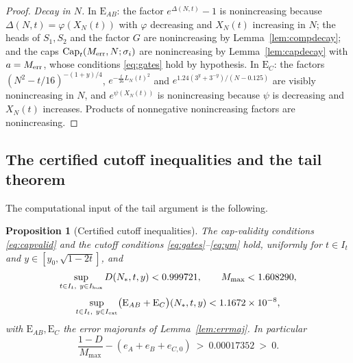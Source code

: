 \documentclass[11pt]{article}
\newtheorem{proposition}[theorem]{Proposition}
\theoremstyle{definition}
\newcommand{\CapT}{\operatorname{Cap}}
\begin{document}
\begin{proof}
\emph{Decay in $N$.} In $\mathrm{E}_{AB}$: the factor
$e^{\Delta(N,t)}-1$ is nonincreasing because
$\Delta(N,t)=\varphi(X_N(t))$ with $\varphi$ decreasing and
$X_N(t)$ increasing in $N$; the heads of $S_1,S_2$ and the factor
$G$ are nonincreasing by Lemma~\ref{lem:compdecay}; and the caps
$\CapT_t(M_{\rm err},N;\sigma_i)$ are nonincreasing by
Lemma~\ref{lem:capdecay} with $a=M_{\rm err}$, whose conditions
\eqref{eq:gates} hold by hypothesis. In $\mathrm{E}_{C}$: the
factors $(N^2-t/16)^{-(1+y)/4}$, $e^{-\frac t{16}L_N(t)^2}$ and
$e^{1.24(3^y+3^{-y})/(N-0.125)}$ are visibly nonincreasing in $N$,
and $e^{\psi(X_N(t))}$ is nonincreasing because $\psi$ is
decreasing and $X_N(t)$ increases. Products of nonnegative
nonincreasing factors are nonincreasing.
\end{proof}

\subsection{The certified cutoff inequalities and the tail theorem}
\label{sec:tailcert}

The computational input of the tail argument is the following.

\begin{proposition}[Certified cutoff inequalities]
\label{prop:tailcert}
The cap-validity conditions \eqref{eq:capvalid} and the cutoff
conditions \eqref{eq:gates}--\eqref{eq:ym} hold, uniformly for
$t\in I_t$ and $y\in[y_0,\sqrt{1-2t}]$, and
\[
\sup_{t\in I_t,\ y\in I_{\rm box}}D(N_*,t,y)<0.999721,
\qquad
M_{\max}<1.608290,
\]
\[
\sup_{t\in I_t,\ y\in I_{\rm ext}}
\bigl(\mathrm{E}_{AB}+\mathrm{E}_{C}\bigr)(N_*,t,y)
<1.1672\times10^{-8},
\]
with $\mathrm{E}_{AB},\mathrm{E}_{C}$ the error majorants of
Lemma~\ref{lem:errmaj}. In particular
\[
\frac{1-D}{M_{\max}}-(e_A+e_B+e_{C,0})\ >\ 0.00017352\ >\ 0 .
\]
\end{proposition}
\end{document}
